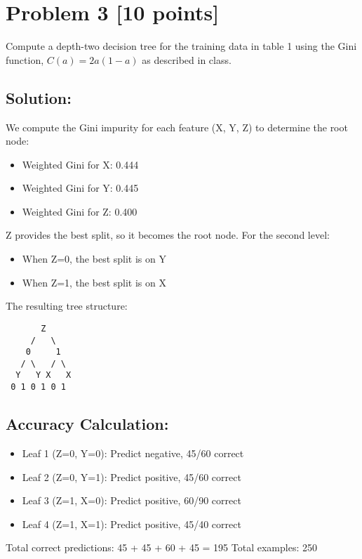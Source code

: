 \documentclass{article}
\begin{document}
\section*{Problem 3 [10 points]}
Compute a depth-two decision tree for the training data in table 1 using the Gini function, $C(a) = 2a(1-a)$ as described in class.

\subsection*{Solution:}
We compute the Gini impurity for each feature (X, Y, Z) to determine the root node:

\begin{itemize}
    \item Weighted Gini for X: 0.444
    \item Weighted Gini for Y: 0.445
    \item Weighted Gini for Z: 0.400
\end{itemize}

Z provides the best split, so it becomes the root node. For the second level:

\begin{itemize}
    \item When Z=0, the best split is on Y
    \item When Z=1, the best split is on X
\end{itemize}

The resulting tree structure:

\begin{verbatim}
       Z
     /   \
    0     1
   / \   / \
  Y   Y X   X
 0 1 0 1 0 1
\end{verbatim}

\subsection*{Accuracy Calculation:}
\begin{itemize}
    \item Leaf 1 (Z=0, Y=0): Predict negative, 45/60 correct
    \item Leaf 2 (Z=0, Y=1): Predict positive, 45/60 correct
    \item Leaf 3 (Z=1, X=0): Predict positive, 60/90 correct
    \item Leaf 4 (Z=1, X=1): Predict positive, 45/40 correct
\end{itemize}

Total correct predictions: 45 + 45 + 60 + 45 = 195
Total examples: 250
\end{document}
